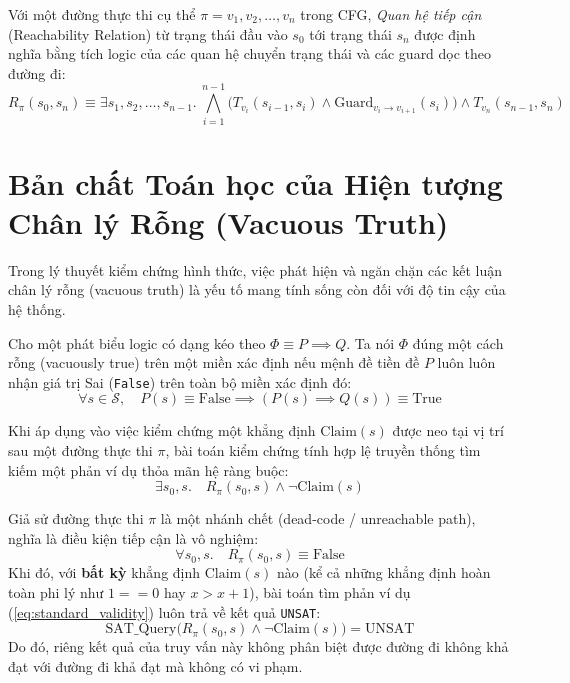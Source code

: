 Với một đường thực thi cụ thể $\pi = v_1, v_2, \dots, v_n$ trong CFG, \textit{Quan hệ tiếp cận} (Reachability Relation) từ trạng thái đầu vào $s_0$ tới trạng thái $s_n$ được định nghĩa bằng tích logic của các quan hệ chuyển trạng thái và các guard dọc theo đường đi:
\begin{equation}
\label{eq:reachability_relation}
R_{\pi}(s_0, s_n) \equiv \exists s_1, s_2, \dots, s_{n-1}. \ \bigwedge_{i=1}^{n-1} \Big( T_{v_i}(s_{i-1}, s_i) \land \text{Guard}_{v_i \rightarrow v_{i+1}}(s_i) \Big) \land T_{v_n}(s_{n-1}, s_n)
\end{equation}

\section{Bản chất Toán học của Hiện tượng Chân lý Rỗng (Vacuous Truth)}
\label{sec:vacuous_truth_analysis}

Trong lý thuyết kiểm chứng hình thức, việc phát hiện và ngăn chặn các kết luận chân lý rỗng (vacuous truth) là yếu tố mang tính sống còn đối với độ tin cậy của hệ thống.

\begin{definition}
Cho một phát biểu logic có dạng kéo theo $\Phi \equiv P \implies Q$. Ta nói $\Phi$ đúng một cách rỗng (vacuously true) trên một miền xác định nếu mệnh đề tiền đề $P$ luôn luôn nhận giá trị Sai (\texttt{False}) trên toàn bộ miền xác định đó:
\begin{equation}
\forall s \in \mathcal{S}, \quad P(s) \equiv \text{False} \implies (P(s) \implies Q(s)) \equiv \text{True}
\end{equation}
\end{definition}

Khi áp dụng vào việc kiểm chứng một khẳng định $\text{Claim}(s)$ được neo tại vị trí sau một đường thực thi $\pi$, bài toán kiểm chứng tính hợp lệ truyền thống tìm kiếm một phản ví dụ thỏa mãn hệ ràng buộc:
\begin{equation}
\label{eq:standard_validity}
\exists s_0, s. \quad R_{\pi}(s_0, s) \land \neg \text{Claim}(s)
\end{equation}

\begin{theorem}
\label{thm:vacuous_hazard}
Giả sử đường thực thi $\pi$ là một nhánh chết (dead-code / unreachable path), nghĩa là điều kiện tiếp cận là vô nghiệm:
\begin{equation}
\forall s_0, s. \quad R_{\pi}(s_0, s) \equiv \text{False}
\end{equation}
Khi đó, với \textbf{bất kỳ} khẳng định $\text{Claim}(s)$ nào (kể cả những khẳng định hoàn toàn phi lý như $1 == 0$ hay $x > x + 1$), bài toán tìm phản ví dụ (\ref{eq:standard_validity}) luôn trả về kết quả \texttt{UNSAT}:
\begin{equation}
\text{SAT\_Query}\Big( R_{\pi}(s_0, s) \land \neg \text{Claim}(s) \Big) = \text{UNSAT}
\end{equation}
Do đó, riêng kết quả của truy vấn này không phân biệt được đường đi không khả đạt với đường đi khả đạt mà không có vi phạm.
\end{theorem}

